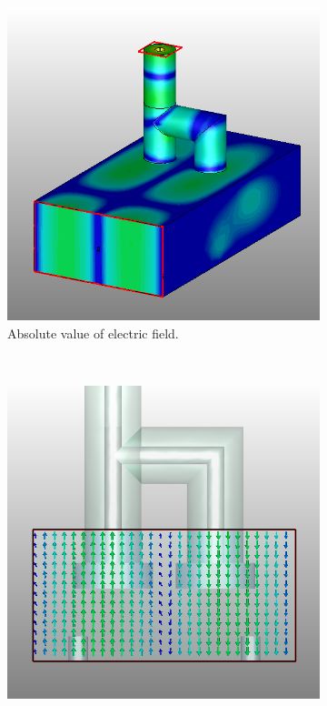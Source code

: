 \documentclass[english,twoside]{article}
\begin{document}
	
		\newpage
		\begin{landscape}
			\begin{figure}
				\centering
				\begin{subfigure}[b]{0.45\textwidth}
					\includegraphics[width=\textwidth]{figures/coaxToWrTE20_alternative_abs}
					\caption{Absolute value of electric field.}
				\end{subfigure}
				~
				\begin{subfigure}[b]{0.45\textwidth}
					\includegraphics[width=\textwidth]{figures/coaxToWrTE20_alternative_front}

\end{subfigure}
\end{figure}
\end{landscape}
\end{document}
